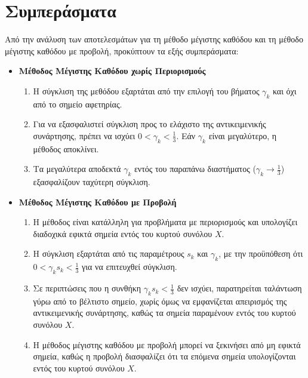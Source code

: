 \documentclass[a4paper,12pt]{article}
\begin{document}
\newpage

\section*{Συμπεράσματα}

Από την ανάλυση των αποτελεσμάτων για τη μέθοδο μέγιστης καθόδου και τη μέθοδο μέγιστης καθόδου με προβολή, 
προκύπτουν τα εξής συμπεράσματα:

\begin{itemize}
    \item \textbf{Μέθοδος Μέγιστης Καθόδου χωρίς Περιορισμούς}
        \begin{enumerate}
            \item Η σύγκλιση της μεθόδου εξαρτάται από την επιλογή του βήματος $\gamma_k$ και όχι από το σημείο 
            αφετηρίας.
            
            \item Για να εξασφαλιστεί σύγκλιση προς το ελάχιστο της αντικειμενικής συνάρτησης, πρέπει να ισχύει 
            $0 < \gamma_k < \frac{1}{3}$. Εάν $\gamma_k$ είναι μεγαλύτερο, η μέθοδος αποκλίνει.
            
            \item Τα μεγαλύτερα αποδεκτά $\gamma_k$ εντός του παραπάνω διαστήματος ($\gamma_k \to \frac{1}{3}$) 
            εξασφαλίζουν ταχύτερη σύγκλιση.
        \end{enumerate}
    \item \textbf{Μέθοδος Μέγιστης Καθόδου με Προβολή}
        \begin{enumerate}
            \item Η μέθοδος είναι κατάλληλη για προβλήματα με περιορισμούς και υπολογίζει διαδοχικά εφικτά σημεία 
            εντός του κυρτού συνόλου $X$.
            
            \item Η σύγκλιση εξαρτάται από τις παραμέτρους $s_k$ και $\gamma_k$, με την προϋπόθεση ότι 
            $0 < \gamma_k s_k < \frac{1}{3}$ για να επιτευχθεί σύγκλιση.
            
            \item Σε περιπτώσεις που η συνθήκη $\gamma_k s_k < \frac{1}{3}$ δεν ισχύει, παρατηρείται ταλάντωση γύρω 
            από το βέλτιστο σημείο, χωρίς όμως να εμφανίζεται απειρισμός της αντικειμενικής συνάρτησης, καθώς τα 
            σημεία παραμένουν εντός του κυρτού συνόλου $X$.
            
            \item Η μέθοδος μέγιστης καθόδου με προβολή μπορεί να ξεκινήσει από μη εφικτά σημεία, καθώς η προβολή 
            διασφαλίζει ότι τα επόμενα σημεία υπολογίζονται εντός του κυρτού συνόλου $X$.
            

\end{enumerate}
\end{itemize}
\end{document}
